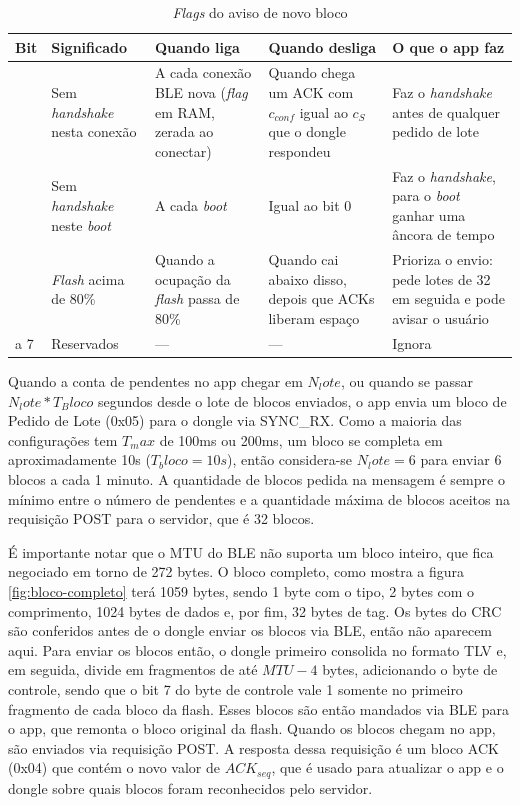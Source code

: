 \documentclass[
	12pt,
	article,			%
	oneside,
	a4paper,
	english,
	brazil				%
	]{abntex2}
\begin{document}
\begin{table}[H]
	\centering
	\caption{\textit{Flags} do aviso de novo bloco}
	\label{tab:flags-aviso-novo-bloco}
	\begin{tabular}{|>{\centering\arraybackslash}m{}|>{\raggedright\arraybackslash}m{}|>{\raggedright\arraybackslash}m{}|>{\raggedright\arraybackslash}m{}|>{\raggedright\arraybackslash}m{}|}
		\hline
		\textbf{Bit} & \textbf{Significado} & \textbf{Quando liga} & \textbf{Quando desliga} & \textbf{O que o app faz} \\
		\hline
		0 & Sem \textit{handshake} nesta conexão & A cada conexão BLE nova (\textit{flag} em RAM, zerada ao conectar) & Quando chega um ACK com $c_{conf}$ igual ao $c_{S}$ que o dongle respondeu & Faz o \textit{handshake} antes de qualquer pedido de lote \\
		\hline
		1 & Sem \textit{handshake} neste \textit{boot} & A cada \textit{boot} & Igual ao bit 0 & Faz o \textit{handshake}, para o \textit{boot} ganhar uma âncora de tempo \\
		\hline
		2 & \textit{Flash} acima de 80\% & Quando a ocupação da \textit{flash} passa de 80\% & Quando cai abaixo disso, depois que ACKs liberam espaço & Prioriza o envio: pede lotes de 32 em seguida e pode avisar o usuário \\
		\hline
		3 a 7 & Reservados & --- & --- & Ignora \\
		\hline
	\end{tabular}
\end{table}

Quando a conta de pendentes no app chegar em $N_lote$, ou quando se passar $N_lote*T_Bloco$ segundos desde o lote de blocos enviados, o app envia um bloco de Pedido de Lote (0x05) para o dongle via SYNC\_RX.
Como a maioria das configurações tem $T_max$ de 100ms ou 200ms, um bloco se completa em aproximadamente 10s ($T_bloco=10s$), então considera-se $N_lote=6$ para enviar 6 blocos a cada 1 minuto.
A quantidade de blocos pedida na mensagem é sempre o mínimo entre o número de pendentes e a quantidade máxima de blocos aceitos na requisição POST para o servidor, que é 32 blocos.

É importante notar que o MTU do BLE não suporta um bloco inteiro, que fica negociado em torno de 272 bytes. O bloco completo, como mostra a figura \ref{fig:bloco-completo} terá 1059 bytes, sendo 1 byte com o 
tipo, 2 bytes com o comprimento, 1024 bytes de dados e, por fim, 32 bytes de tag. Os bytes do CRC são conferidos antes de o dongle enviar os blocos via BLE, então não aparecem aqui.
Para enviar os blocos então, o dongle primeiro consolida no formato TLV e, em seguida, divide em fragmentos de até $MTU - 4$ bytes, adicionando o byte de controle, sendo que o bit 7 do byte de controle vale 1 somente
no primeiro fragmento de cada bloco da flash. Esses blocos são então mandados via BLE para o app, que remonta o bloco original da flash. Quando os blocos chegam no app, são enviados via requisição POST. A resposta
dessa requisição é um bloco ACK (0x04) que contém o novo valor de $ACK_{seq}$, que é usado para atualizar o app e o dongle sobre quais blocos foram reconhecidos pelo servidor.
\end{document}
